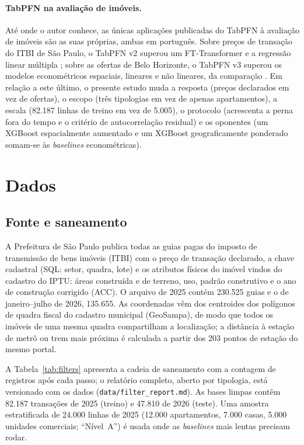 \documentclass[11pt,a4paper]{article}
\begin{document}
\paragraph{TabPFN na avaliação de imóveis.} Até onde o autor conhece, as únicas aplicações
publicadas do TabPFN à avaliação de imóveis são as suas próprias, ambas em português. Sobre
preços de transação do ITBI de São Paulo, o TabPFN v2 superou um FT-Transformer e a regressão
linear múltipla \citep{benvenho2026igel}; sobre as ofertas de Belo Horizonte, o TabPFN v3
superou os modelos econométricos espaciais, lineares e não lineares, da comparação
\citep{benvenho2026cead}. Em relação a este último, o presente estudo muda a resposta (preços
declarados em vez de ofertas), o escopo (três tipologias em vez de apenas apartamentos), a
escala (82.187 linhas de treino em vez de 5.005), o protocolo (acrescenta a perna fora do tempo
e o critério de autocorrelação residual) e os oponentes (um XGBoost espacialmente aumentado e
um XGBoost geograficamente ponderado somam-se às \emph{baselines} econométricas).

\section{Dados}
\label{sec:data}

\subsection{Fonte e saneamento}

A Prefeitura de São Paulo publica todas as guias pagas do imposto de transmissão de bens
imóveis (ITBI) com o preço de transação declarado, a chave cadastral (SQL: setor, quadra, lote)
e os atributos físicos do imóvel vindos do cadastro do IPTU: áreas construída e de terreno,
uso, padrão construtivo e o ano de construção corrigido (ACC). O arquivo de 2025 contém 230.525 guias e
o de janeiro--julho de 2026, 135.655. As coordenadas vêm dos centroides dos polígonos de quadra
fiscal do cadastro municipal (GeoSampa), de modo que todos os imóveis de uma mesma quadra
compartilham a localização; a distância à estação de metrô ou trem mais próxima é calculada a
partir dos 203 pontos de estação do mesmo portal.

A Tabela~\ref{tab:filters} apresenta a cadeia de saneamento com a contagem de registros após
cada passo; o relatório completo, aberto por tipologia, está versionado com os dados
(\texttt{data/filter\_report.md}). As bases limpas contêm 82.187 transações de 2025 (treino) e
47.810 de 2026 (teste). Uma amostra estratificada de 24.000 linhas de 2025 (12.000
apartamentos, 7.000 casas, 5.000 unidades comerciais; ``Nível~A'') é usada onde as
\emph{baselines} mais lentas precisam rodar.
\end{document}
